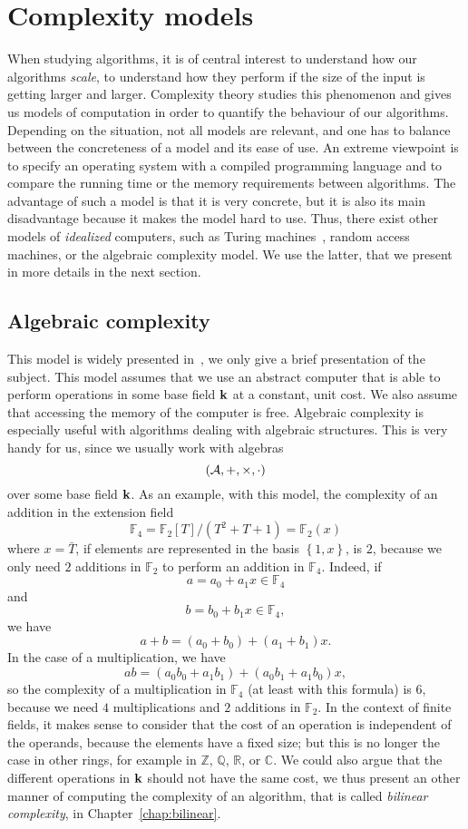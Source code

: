 \section{Complexity models}
\label{sec:complexity-models}

When studying algorithms, it is of central interest to understand how our algorithms
\emph{scale}, \ie to understand how they perform if the size of the input is
getting larger and larger. Complexity theory studies this phenomenon and gives us models
of computation in order to quantify the behaviour of our algorithms. Depending
on the situation, not all models are relevant, and one has to balance between
the concreteness of a model and its ease of use. An extreme viewpoint is to
specify an operating system with a compiled programming language and to compare
the running time or the memory requirements between algorithms. The advantage of
such a model is that it is very concrete, but it is also its main disadvantage
because it makes the model hard to use. Thus, there exist other models of
\emph{idealized} computers, such as Turing machines~\cite{Papadimitriou03},
random access machines, or the algebraic complexity model.
We use the latter, that we present in more details in the next section.

\subsection{Algebraic complexity}

This model is widely presented in~\cite{BCS13}, we only give a brief
presentation of the subject. This model assumes that we use an abstract computer
that is able to perform operations in some base field $\mathbf{k}$ at a constant, unit
cost. We also assume that accessing the memory of the computer is free.
Algebraic complexity is especially useful with algorithms dealing with
algebraic structures. This is very handy for us, since
we usually work with algebras
\[
  (\mathcal{A}, +, \times, \cdot)
\]
over some base field $\mathbf{k}$. As an example, with this model, the complexity of an
addition in the extension field
\[
  \mathbb{F}_4 = \mathbb{F}_2[T]/(T^2+T+1) = \mathbb{F}_2(x)
\]
where $x=\bar T$, if elements are represented in the basis $\left\{ 1, x
\right\}$, is $2$, because we only need $2$ additions in $\mathbb{F}_2$ to
perform an addition in $\mathbb{F}_4$. Indeed, if
\[
  a = a_0 + a_1x\in\mathbb{F}_4
\]
and
\[
  b = b_0 + b_1x\in\mathbb{F}_4,
\]
we have
\[
  a+b = (a_0+b_0)+(a_1+b_1)x.
\]
In the case of a multiplication, we have
\[
  ab = (a_0b_0+a_1b_1) + (a_0b_1+a_1b_0)x,
\]
so the complexity of a multiplication in $\mathbb{F}_4$ (at least with this
formula) is $6$, because we need
$4$ multiplications and $2$ additions in $\mathbb{F}_2$. In the context of
finite fields, it makes sense to consider that the cost of an operation is
independent of the operands, because the elements have a fixed size; but this is
no longer the case in other rings, for example in $\mathbb{Z}$, $\mathbb{Q}$,
$\mathbb{R}$, or $\mathbb{C}$. We could also argue that the different operations
in $\mathbf{k}$ should not have the same cost, we thus present an other manner of
computing the complexity of an algorithm, that is called \emph{bilinear
complexity}, in Chapter~\ref{chap:bilinear}.

